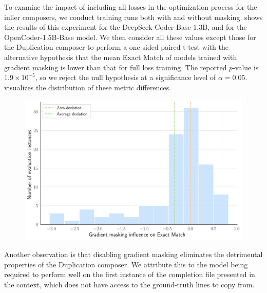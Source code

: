 To examine the impact of including all losses in the optimization process for the inlier composers, we conduct training runs both with and without masking.  shows the results of this experiment for the DeepSeek-Coder-Base 1.3B, and  for the OpenCoder-1.5B-Base model. We then consider all these values except those for the Duplication composer to perform a one-sided paired t-test with the alternative hypothesis that the mean Exact Match of models trained with gradient masking is lower than that for full loss training. The reported \(p\)-value is \(1.9 \times 10^{-5}\), so we reject the null hypothesis at a significance level of \(\alpha = 0.05\).  visualizes the distribution of these metric differences.

\begin{figure}[ht]
    \centering
    \includegraphics[width=\textwidth]{figures/gradient-masking.pdf}
    \label{fig:gradient-masking}
\end{figure}

Another observation is that disabling gradient masking eliminates the detrimental properties of the Duplication composer. We attribute this to the model being required to perform well on the first instance of the completion file presented in the context, which does not have access to the ground-truth lines to copy from.

